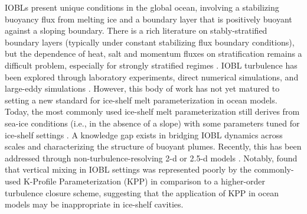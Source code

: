 \documentclass[tc, manuscript]{copernicus}
\begin{document}
IOBLs present unique conditions in the global ocean, involving a stabilizing buoyancy flux from melting ice and a boundary layer that is positively buoyant against a sloping boundary. There is a rich literature on stably-stratified boundary layers (typically under constant stabilizing flux boundary conditions), but the dependence of heat, salt and momentum fluxes on stratification remains a difficult problem, especially for strongly stratified regimes \citep{zonta_stably_2018}. IOBL turbulence has been explored through laboratory experiments, direct numerical simulations, and large-eddy simulations \citep{middleton_numerical_2021, mondal_ablation_2019, vreugdenhil_stratification_2019, mcconnochie_dissolution_2018, rosevear_role_2021}. However, this body of work has not yet matured to setting a new standard for ice-shelf melt parameterization in ocean models. Today, the most commonly used ice-shelf melt parameterization still derives from sea-ice conditions (i.e., in the absence of a slope) with some parameters tuned for ice-shelf settings \citep{holland_modeling_1999, jenkins_observation_2010, mcphee_dynamics_1987}. A knowledge gap exists in bridging IOBL dynamics across scales and characterizing the structure of buoyant plumes. Recently, this has been addressed through non-turbulence-resolving 2-d or 2.5-d models \citep{cheng_modeling_2020, jenkins_simple_2016, jenkins_shear_2021}. Notably, \citet{jenkins_shear_2021} found that vertical mixing in IOBL settings was represented poorly by the commonly-used K-Profile Parameterization (KPP) in comparison to a higher-order turbulence closure scheme, suggesting that the application of KPP in ocean models may be inappropriate in ice-shelf cavities. 
\end{document}
